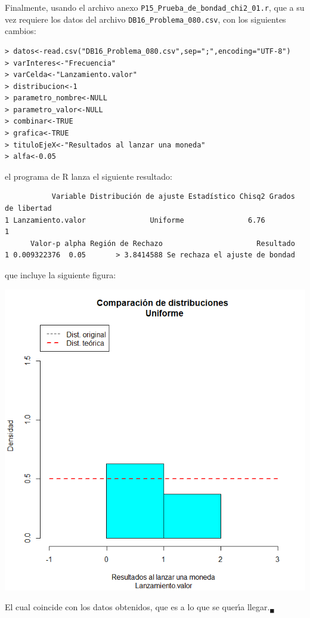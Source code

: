 \begin{solucion}
 Finalmente, usando el archivo anexo
 \texttt{P15\_Prueba\_de\_bondad\_chi2\_01.r},
 que a su vez requiere los datos del archivo
 \texttt{DB16\_Problema\_080.csv}, con los siguientes cambios:
 \begin{verbatim}
> datos<-read.csv("DB16_Problema_080.csv",sep=";",encoding="UTF-8")
> varInteres<-"Frecuencia"
> varCelda<-"Lanzamiento.valor"
> distribucion<-1
> parametro_nombre<-NULL
> parametro_valor<-NULL
> combinar<-TRUE
> grafica<-TRUE
> tituloEjeX<-"Resultados al lanzar una moneda"
> alfa<-0.05
 \end{verbatim}
 \vspace{-0.7cm}
 el programa de R lanza el siguiente resultado:
 \begin{verbatim}
           Variable Distribución de ajuste Estadístico Chisq2 Grados de libertad
1 Lanzamiento.valor               Uniforme               6.76                  1
      Valor-p alpha Región de Rechazo                      Resultado
1 0.009322376  0.05       > 3.8414588 Se rechaza el ajuste de bondad
 \end{verbatim}
 \vspace{-0.7cm}
 que incluye la siguiente figura:
 \begin{center}
  \includegraphics[scale=0.35]{Problema_80.png}
 \end{center}
 El cual coincide con los datos obtenidos,
 que es a lo que se quer\'{\i}a llegar.${}_{\blacksquare}$
\end{solucion}
